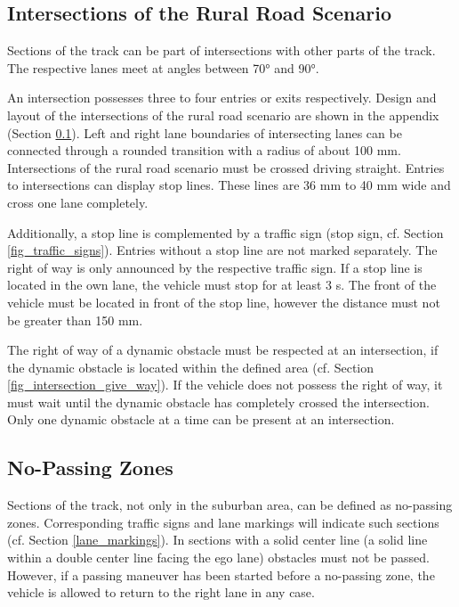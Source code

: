 \documentclass[a4paper]{report}
\begin{document}
\subsection{Intersections of the Rural Road Scenario}
\label{intersection_rural}

Sections of the track can be part of intersections with other parts of the
track. The respective lanes meet at angles between 70° and 90°.

An intersection possesses three to four entries or exits respectively. Design
and layout of the intersections of the rural road scenario are shown in the
appendix (Section \ref{intersection_rural}). Left and right lane boundaries of
intersecting lanes can be connected through a rounded transition with a radius
of about 100 mm. Intersections of the rural road scenario must be crossed
driving straight. Entries to intersections can display stop lines. These lines
are 36 mm to 40 mm wide and cross one lane completely.

Additionally, a stop line is complemented by a traffic sign (stop sign, cf.
Section \ref{fig_traffic_signs}). Entries without a stop line are not marked
separately. The right of way is only announced by the respective traffic sign.
If a stop line is located in the own lane, the vehicle must stop for at least 3
s. The front of the vehicle must be located in front of the stop line, however
the distance must not be greater than 150 mm.

The right of way of a dynamic obstacle must be respected at an intersection, if
the dynamic obstacle is located within the defined area (cf. Section
\ref{fig_intersection_give_way}). If the vehicle does not possess the right of
way, it must wait until the dynamic obstacle has completely crossed the
intersection. Only one dynamic obstacle at a time can be present at an
intersection.

\subsection{No-Passing Zones}
\label{no_passing_zones}

Sections of the track, not only in the suburban area, can be defined as
no-passing zones. Corresponding traffic signs and lane markings will indicate
such sections (cf. Section \ref{lane_markings}). In sections with a solid
center line (a solid line within a double center line facing the ego lane)
obstacles must not be passed. However, if a passing maneuver has been started
before a no-passing zone, the vehicle is allowed to return to the right lane in
any case.
\end{document}
